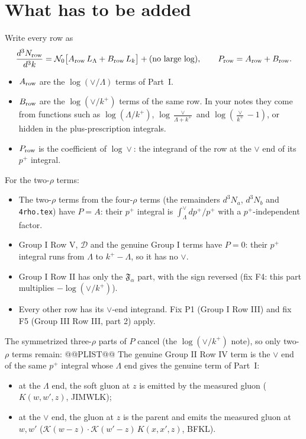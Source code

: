 \documentclass[10pt]{article}
\numberwithin{equation}{section}
\newcommand{\KK}{\mathcal K}
\newcommand{\NO}{\mathcal N_0}
\newcommand{\LL}{L_\Lambda}
\newcommand{\Lk}{L_k}
\begin{document}
\section{What has to be added}\label{sec:P}
Write every row as
\begin{equation*}
\frac{d^3N_{\rm row}}{d^3k}=\NO\big[A_{\rm row}\,\LL+B_{\rm row}\,\Lk\big]+(\text{no large log}),\qquad P_{\rm row}=A_{\rm row}+B_{\rm row}.
\end{equation*}
\begin{itemize}
\item $A_{\rm row}$ are the $\log(\vee/\Lambda)$ terms of Part~I.
\item $B_{\rm row}$ are the $\log(\vee/k^+)$ terms of the same row. In your notes they come from functions such as $\log(\Lambda/k^+)$, $\log\frac\vee{\Lambda+k^+}$ and $\log(\frac\vee{k^+}-1)$, or hidden in the plus-prescription integrals.
\item $P_{\rm row}$ is the coefficient of $\log\vee$: the integrand of the row at the $\vee$ end of its $p^+$ integral.
\end{itemize}
For the two-$\rho$ terms:
\begin{itemize}
\item The two-$\rho$ terms from the four-$\rho$ terms (the remainders $d^3N_a$, $d^3N_b$ and \texttt{4rho.tex}) have $P=A$: their $p^+$ integral is $\int_\Lambda^\vee dp^+/p^+$ with a $p^+$-independent factor.
\item Group I Row V, $\mathcal D$ and the genuine Group I terms have $P=0$: their $p^+$ integral runs from $\Lambda$ to $k^+-\Lambda$, so it has no $\vee$.
\item Group I Row II has only the $\mathfrak F_\alpha$ part, with the sign reversed (fix F4: this part multiplies $-\log(\vee/k^+)$).
\item Every other row has its $\vee$-end integrand. Fix P1 (Group I Row III) and fix F5 (Group III Row III, part 2) apply.
\end{itemize}
The symmetrized three-$\rho$ parts of $P$ cancel (the $\log(\vee/k^+)$ note), so only two-$\rho$ terms remain:
@@PLIST@@
The genuine Group II Row IV term is the $\vee$ end of the same $p^+$ integral whose $\Lambda$ end gives the genuine term of Part~I:
\begin{itemize}
\item at the $\Lambda$ end, the soft gluon at $z$ is emitted by the measured gluon ($K(w,w',z)$, JIMWLK);
\item at the $\vee$ end, the gluon at $z$ is the parent and emits the measured gluon at $w,w'$ ($\KK(w-z)\cdot\KK(w'-z)\,K(x,x',z)$, BFKL).
\end{itemize}
\end{document}
